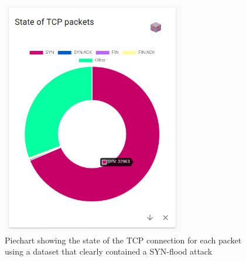 \begin{figure}
    \centering
    \includegraphics[width=8cm]{images/evaluation-synflood-piechart.png}
    \caption{Piechart showing the state of the TCP connection for each packet using a dataset that clearly contained a SYN-flood attack}
    \label{fig:synfloodpiechart}
\end{figure}

